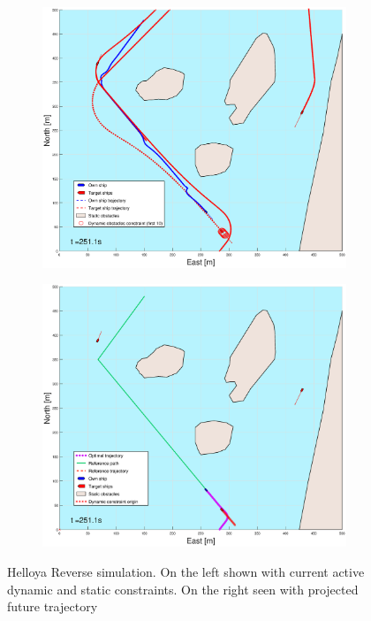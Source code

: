 \begin{figure}[ht]
\begin{subfigure}[b]{0.499\textwidth}
    \end{subfigure}
    \hfill
    \\
    \begin{subfigure}[b]{0.49\textwidth}
        \centering
        \includegraphics[width=\textwidth]{Images/Figures/Helloya_Rev/_Simple_1fig1_time=251}
    \end{subfigure}
    \hfill
    \begin{subfigure}[b]{0.499\textwidth}
        \centering
        \includegraphics[width=\textwidth]{Images/Figures/Helloya_Rev/_Simple_1fig999_time=251}
    \end{subfigure}
    \hfill
    \caption{Helloya Reverse simulation. On the left shown with current active dynamic and static constraints. On the right seen with projected future trajectory}
\end{figure}



